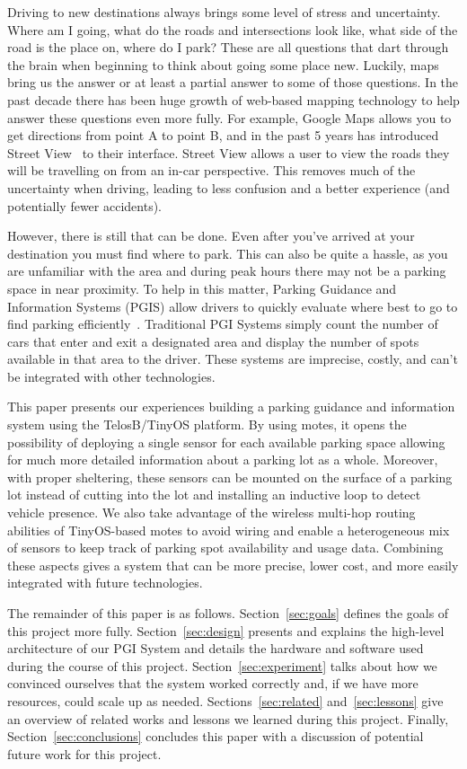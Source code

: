 \documentclass{acm_proc}
\begin{document}
Driving to new destinations always brings some level of stress and
uncertainty.
Where am I going, what do the roads and intersections look like, what side
of the road is the place on, where do I park?
These are all questions that dart through the brain when beginning to think
about going some place new.
Luckily, maps bring us the answer or at least a partial answer to some of
those questions.
In the past decade there has been huge growth of web-based mapping
technology to help answer these questions even more fully.
For example, Google Maps allows you to get directions from point A to point
B, and in the past 5 years has introduced Street
View~\cite{vincent:streetview} to their interface.
Street View allows a user to view the roads they will be travelling on from
an in-car perspective.
This removes much of the uncertainty when driving, leading to less
confusion and a better experience (and potentially fewer accidents).

However, there is still that can be done.
Even after you've arrived at your destination you must find where to park.
This can also be quite a hassle, as you are unfamiliar with the area and
during peak hours there may not be a parking space in near proximity.
To help in this matter, Parking Guidance and Information Systems (PGIS)
allow drivers to quickly evaluate where best to go to find parking
efficiently~\cite{sakai:pgi-toyota}.
Traditional PGI Systems simply count the number of cars that enter and exit
a designated area and display the number of spots available in that area to
the driver.
These systems are imprecise, costly, and can't be integrated with other
technologies.

This paper presents our experiences building a parking guidance and
information system using the TelosB/TinyOS platform.
By using motes, it opens the possibility of deploying a single sensor for
each available parking space allowing for much more detailed information
about a parking lot as a whole.
Moreover, with proper sheltering, these sensors can be mounted on the
surface of a parking lot instead of cutting into the lot and installing an
inductive loop to detect vehicle presence.
We also take advantage of the wireless multi-hop routing abilities of
TinyOS-based motes to avoid wiring and enable a heterogeneous mix of
sensors to keep track of parking spot availability and usage data.
Combining these aspects gives a system that can be more precise, lower
cost, and more easily integrated with future technologies.

The remainder of this paper is as follows.
Section~\ref{sec:goals} defines the goals of this project more fully.
Section~\ref{sec:design} presents and explains the high-level architecture
of our PGI System and details the hardware and software used during the
course of this project.
Section~\ref{sec:experiment} talks about how we convinced ourselves that
the system worked correctly and, if we have more resources, could scale up
as needed.
Sections~\ref{sec:related} and~\ref{sec:lessons} give an overview of
related works and lessons we learned during this project.
Finally, Section~\ref{sec:conclusions} concludes this paper with a
discussion of potential future work for this project.
\end{document}
